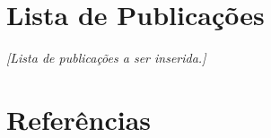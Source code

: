 \documentclass[12pt,a4paper,oneside]{book}
\theoremstyle{remark}
\newcommand{\citar}[1]{[\ref{ref:#1}]}
\theoremstyle{plain}
\theoremstyle{definition}
\begin{document}
\chapter{Lista de Publicações}
\label{app:pub}


\textit{[Lista de publicações a ser inserida.]}

\backmatter

\chapter*{Referências}

\end{document}
